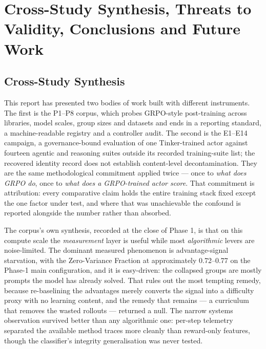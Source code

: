 \documentclass[12pt,a4paper]{report}
\begin{document}
\chapter{Cross-Study Synthesis, Threats to Validity, Conclusions and
Future
Work}\label{cross-study-synthesis-threats-to-validity-conclusions-and-future-work}

\section{Cross-Study Synthesis}\label{cross-study-synthesis}

This report has presented two bodies of work built with different
instruments. The first is the P1--P8 corpus, which probes GRPO-style
post-training across libraries, model scales, group sizes and datasets
and ends in a reporting standard, a machine-readable registry and a
controller audit. The second is the E1--E14 campaign, a governance-bound
evaluation of one Tinker-trained actor against fourteen agentic and
reasoning suites outside its recorded training-suite list; the recovered
identity record does not establish content-level decontamination. They
are the same methodological commitment applied twice --- once to
\emph{what does GRPO do}, once to \emph{what does a GRPO-trained actor
score}. That commitment is attribution: every comparative claim holds
the entire training stack fixed except the one factor under test, and
where that was unachievable the confound is reported alongside the
number rather than absorbed.

The corpus's own synthesis, recorded at the close of Phase 1, is that on
this compute scale the \emph{measurement} layer is useful while most
\emph{algorithmic} levers are noise-limited. The dominant measured
phenomenon is advantage-signal starvation, with the Zero-Variance
Fraction at approximately 0.72--0.77 on the Phase-1 main configuration,
and it is easy-driven: the collapsed groups are mostly prompts the model
has already solved. That rules out the most tempting remedy, because
re-baselining the advantages merely converts the signal into a
difficulty proxy with no learning content, and the remedy that remains
--- a curriculum that removes the wasted rollouts --- returned a null.
The narrow systems observation survived better than any algorithmic one:
per-step telemetry separated the available method traces more cleanly
than reward-only features, though the classifier's integrity
generalisation was never tested.
\end{document}

